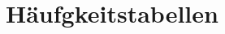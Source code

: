 %
%
\glsresetall

\let\raggedsection\centering 
\chapter{Häufgkeitstabellen}\label{anhang.hauefigkeitstabelle}
\let\raggedsection\raggedright 
